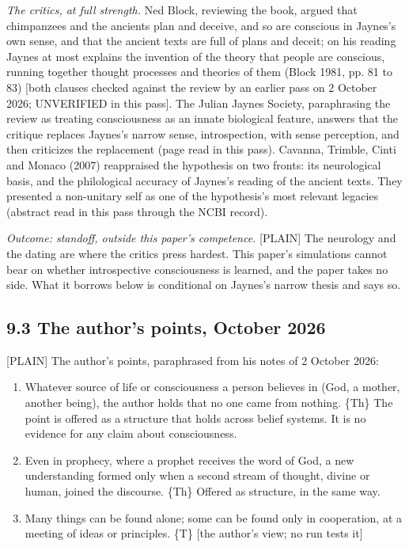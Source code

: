 \documentclass[11pt]{article}
\newcommand{\register}[1]{{\ttfamily\small #1}}
\begin{document}
\emph{The critics, at full strength.} Ned Block, reviewing the book, argued that chimpanzees and the ancients plan and deceive, and so are conscious in Jaynes's own sense, and that the ancient texts are full of plans and deceit; on his reading Jaynes at most explains the invention of the theory that people are conscious, running together thought processes and theories of them (Block 1981, pp. 81 to 83) [both clauses checked against the review by an earlier pass on 2 October 2026; UNVERIFIED in this pass]. The Julian Jaynes Society, paraphrasing the review as treating consciousness as an innate biological feature, answers that the critique replaces Jaynes's narrow sense, introspection, with sense perception, and then criticizes the replacement (page read in this pass). Cavanna, Trimble, Cinti and Monaco (2007) reappraised the hypothesis on two fronts: its neurological basis, and the philological accuracy of Jaynes's reading of the ancient texts. They presented a non-unitary self as one of the hypothesis's most relevant legacies (abstract read in this pass through the NCBI record).

\emph{Outcome: standoff, outside this paper's competence.} \register{[PLAIN]} The neurology and the dating are where the critics press hardest. This paper's simulations cannot bear on whether introspective consciousness is learned, and the paper takes no side. What it borrows below is conditional on Jaynes's narrow thesis and says so.

\subsection*{9.3 The author's points, October 2026}

\register{[PLAIN]} The author's points, paraphrased from his notes of 2 October 2026:

\begin{enumerate}
\item Whatever source of life or consciousness a person believes in (God, a mother, another being), the author holds that no one came from nothing. \{Th\} The point is offered as a structure that holds across belief systems. It is no evidence for any claim about consciousness.
\item Even in prophecy, where a prophet receives the word of God, a new understanding formed only when a second stream of thought, divine or human, joined the discourse. \{Th\} Offered as structure, in the same way.
\item Many things can be found alone; some can be found only in cooperation, at a meeting of ideas or principles. \{T\} [the author's view; no run tests it]
\end{enumerate}
\end{document}
